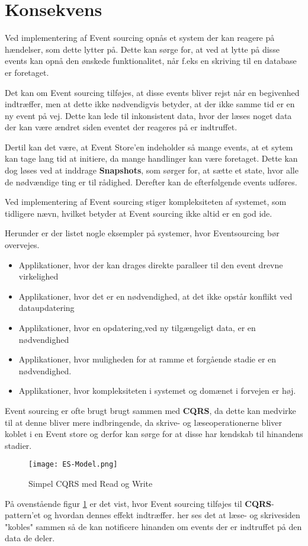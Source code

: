 \section{Konsekvens}
Ved implementering af Event sourcing opnås et system der kan reagere på hændelser, som dette lytter på. Dette kan sørge for, at ved at lytte på disse events kan opnå den ønskede funktionalitet, når f.eks en skriving til en database er foretaget.

Det kan om Event sourcing tilføjes, at disse events bliver rejst når en begivenhed indtræffer, men at dette ikke nødvendigvis betyder, at der ikke samme tid er en ny event på vej. Dette kan lede til inkonsistent data, hvor der læses noget data der kan være ændret siden eventet der reageres på er indtruffet.

Dertil kan det være, at Event Store'en indeholder så mange events, at et sytem kan tage lang tid at initiere, da mange handlinger kan være foretaget. Dette kan dog løses ved at inddrage \textbf{Snapshots}, som sørger for, at sætte et state, hvor alle de nødvændige ting er til rådighed. Derefter kan de efterfølgende events udføres.

Ved implementering af Event sourcing stiger kompleksiteten af systemet, som tidligere nævn, hvilket betyder at Event sourcing ikke altid er en god ide. 

Herunder er der listet nogle eksempler på systemer, hvor Eventsourcing bør overvejes.
\begin{itemize}
	\item Applikationer, hvor der kan drages direkte paralleer til den event drevne virkelighed
	\item Applikationer, hvor det er en nødvendighed, at det ikke opstår konflikt ved dataupdatering 
	\item Applikationer, hvor en opdatering,ved ny tilgængeligt data, er en nødvendighed
	\item Applikationer, hvor muligheden for at ramme et forgående stadie er en nødvendighed.
	\item Applikationer, hvor kompleksiteten i systemet og domænet i forvejen er høj.
\end{itemize}

Event sourcing er ofte brugt brugt sammen med \textbf{CQRS}, da dette kan medvirke til at denne  bliver mere indbringende, da skrive- og læseoperationerne bliver koblet i en Event store og derfor kan sørge for at disse har kendskab til hinandens stadier.

\begin{figure}[H]
	\center
	\texttt{[image: ES-Model.png]}
	\caption{Simpel CQRS med Read og Write}
	\label{fig:cqrs-ES_model}
\end{figure}

På ovenstående figur \ref{fig:cqrs-ES_model} er det vist, hvor Event sourcing tilføjes til \textbf{CQRS}-pattern'et og hvordan dennes effekt indtræffer. her ses det at læse- og skrivesiden "kobles" sammen så de kan notificere hinanden om events der er indtruffet på den data de deler. 